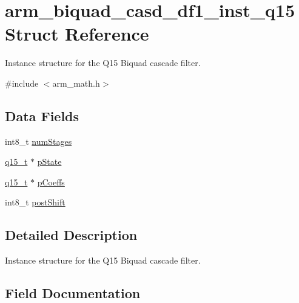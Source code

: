 \hypertarget{structarm__biquad__casd__df1__inst__q15}{}\section{arm\+\_\+biquad\+\_\+casd\+\_\+df1\+\_\+inst\+\_\+q15 Struct Reference}
\label{structarm__biquad__casd__df1__inst__q15}


Instance structure for the Q15 Biquad cascade filter.  




{\ttfamily \#include $<$arm\+\_\+math.\+h$>$}

\subsection*{Data Fields}
\begin{DoxyCompactItemize}
\item 
int8\+\_\+t \mbox{\hyperlink{structarm__biquad__casd__df1__inst__q15_af59c4ceb94f92d6613492b37e7c949de}{num\+Stages}}
\item 
\mbox{\hyperlink{arm__math_8h_ab5a8fb21a5b3b983d5f54f31614052ea}{q15\+\_\+t}} $\ast$ \mbox{\hyperlink{structarm__biquad__casd__df1__inst__q15_ae29dfdb736374fcddaeaec4b7770170c}{p\+State}}
\item 
\mbox{\hyperlink{arm__math_8h_ab5a8fb21a5b3b983d5f54f31614052ea}{q15\+\_\+t}} $\ast$ \mbox{\hyperlink{structarm__biquad__casd__df1__inst__q15_a7ca181a37f714d174445f486bebce26f}{p\+Coeffs}}
\item 
int8\+\_\+t \mbox{\hyperlink{structarm__biquad__casd__df1__inst__q15_a3603cbf084938b6931bcb05dfe487f09}{post\+Shift}}
\end{DoxyCompactItemize}


\subsection{Detailed Description}
Instance structure for the Q15 Biquad cascade filter. 

\subsection{Field Documentation}
\mbox{\label{structarm__biquad__casd__df1__inst__q15_af59c4ceb94f92d6613492b37e7c949de}} 
